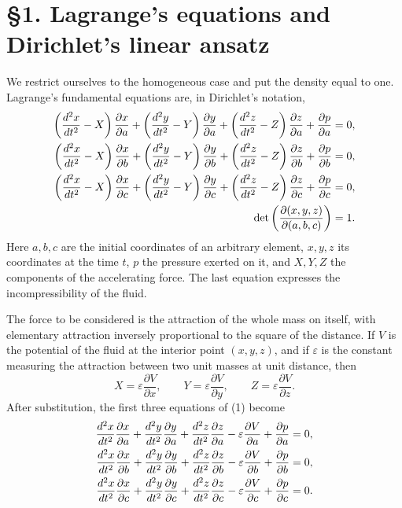 \documentclass[11pt]{article}
\newcommand{\eps}{\varepsilon}
\newcommand{\pder}[2]{\frac{\partial #1}{\partial #2}}
\newcommand{\tdd}[1]{\frac{d^2 #1}{dt^2}}
\begin{document}
\section*{\S1. Lagrange's equations and Dirichlet's linear ansatz}

We restrict ourselves to the homogeneous case and put the density equal to one.  Lagrange's fundamental equations are, in Dirichlet's notation,
\begin{align}
 \left(\tdd{x}-X\right)\pder{x}{a}
 +\left(\tdd{y}-Y\right)\pder{y}{a}
 +\left(\tdd{z}-Z\right)\pder{z}{a}
 +\pder{p}{a}&=0,\notag\\
 \left(\tdd{x}-X\right)\pder{x}{b}
 +\left(\tdd{y}-Y\right)\pder{y}{b}
 +\left(\tdd{z}-Z\right)\pder{z}{b}
 +\pder{p}{b}&=0,\\
 \left(\tdd{x}-X\right)\pder{x}{c}
 +\left(\tdd{y}-Y\right)\pder{y}{c}
 +\left(\tdd{z}-Z\right)\pder{z}{c}
 +\pder{p}{c}&=0,\notag\\
 \det\left(\frac{\partial(x,y,z)}{\partial(a,b,c)}\right)&=1.\notag
\end{align}
Here \(a,b,c\) are the initial coordinates of an arbitrary element, \(x,y,z\) its coordinates at the time \(t\), \(p\) the pressure exerted on it, and \(X,Y,Z\) the components of the accelerating force.  The last equation expresses the incompressibility of the fluid.

The force to be considered is the attraction of the whole mass on itself, with elementary attraction inversely proportional to the square of the distance.  If \(V\) is the potential of the fluid at the interior point \((x,y,z)\), and if \(\eps\) is the constant measuring the attraction between two unit masses at unit distance, then
\[
 X=\eps\pder{V}{x},\qquad Y=\eps\pder{V}{y},\qquad Z=\eps\pder{V}{z}.
\]
After substitution, the first three equations of (1) become
\begin{align}
 \tdd{x}\pder{x}{a}+\tdd{y}\pder{y}{a}+\tdd{z}\pder{z}{a}
 -\eps\pder{V}{a}+\pder{p}{a}&=0,\notag\\
 \tdd{x}\pder{x}{b}+\tdd{y}\pder{y}{b}+\tdd{z}\pder{z}{b}
 -\eps\pder{V}{b}+\pder{p}{b}&=0,\\
 \tdd{x}\pder{x}{c}+\tdd{y}\pder{y}{c}+\tdd{z}\pder{z}{c}
 -\eps\pder{V}{c}+\pder{p}{c}&=0.\notag
\end{align}
\end{document}

